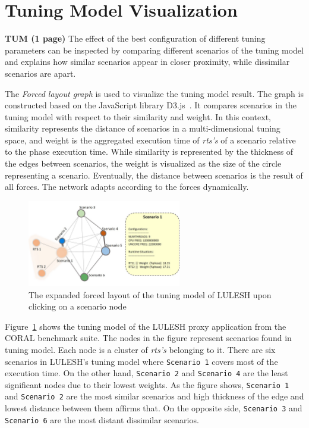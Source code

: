 \section{Tuning Model Visualization} \label{tm-visualization}
\textbf{TUM (1 page)}
The effect of the best configuration of different tuning parameters can be inspected by comparing different scenarios of the tuning model and explains how similar scenarios appear in closer proximity, while dissimilar scenarios are apart.

The \textit{Forced layout graph} is used to visualize the tuning model result. The graph is constructed based on the JavaScript library D3.js~\cite{bostock2011d3}. It compares scenarios in the tuning model with respect to their similarity and weight. In this context, similarity represents the distance of scenarios in a multi-dimensional tuning space, and weight is the aggregated execution time of \textit{rts's} of a scenario relative to the phase execution time. While similarity is represented by the thickness of the edges between scenarios, the weight is visualized as the size of the circle representing a scenario. Eventually, the distance between scenarios is the result of all forces. The network adapts according to the forces dynamically. 

\begin{figure}
	\begin{mdframed}
	\centering
		\includegraphics[width=0.60\textwidth]{figures/luleshTM_expand.jpg}
	\end{mdframed}
	\caption{\label{fig:forced-layout-expand}The expanded forced layout of the tuning model of LULESH upon clicking on a scenario node }
\end{figure}

Figure~\ref{fig:forced-layout-expand} shows the tuning model of the LULESH proxy application from the CORAL benchmark suite. The nodes in the figure represent scenarios found in tuning model. Each node is a cluster of \textit{rts's} belonging to it. There are six scenarios in LULESH's tuning model where \texttt{Scenario~1} covers most of the execution time. On the other hand, \texttt{Scenario~2} and \texttt{Scenario~4} are the least significant nodes due to their lowest weights. As the figure shows, \texttt{Scenario~1} and \texttt{Scenario~2} are the most similar scenarios and high thickness of the edge and lowest distance between them affirms that. On the opposite side, \texttt{Scenario~3} and \texttt{Scenario~6} are the most distant dissimilar scenarios.

